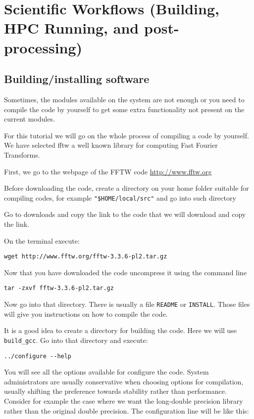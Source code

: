 \chapter{Scientific Workflows (Building, HPC Running, and post-processing)}


\section{Building/installing software}
Sometimes, the modules available on the system are not enough or you need to compile the code by yourself to get some extra functionality not present on the current modules. 

For this tutorial we will go on the whole process of compiling a code by yourself.
We have selected fftw a well known library for computing Fast Fourier Transforms. 

First, we go to the webpage of the FFTW code \url{http://www.fftw.org}

Before downloading the code, create a directory on your home folder suitable for compiling codes, for example \verb|"$HOME/local/src"| and go into such directory

Go to downloads and copy the link to the code that we will download and copy the link.

On the terminal execute:

\begin{lstlisting}
wget http://www.fftw.org/fftw-3.3.6-pl2.tar.gz
\end{lstlisting}

Now that you have downloaded the code uncompress it using the command line

\begin{lstlisting}
tar -zxvf fftw-3.3.6-pl2.tar.gz
\end{lstlisting}

Now go into that directory. There is usually a file \texttt{README} or \texttt{INSTALL}. Those files will give you instructions on how to compile the code.

It is a good idea to create a directory for building the code. Here we will use \verb|build_gcc|.
Go into that directory and execute:

\begin{lstlisting}
../configure --help
\end{lstlisting}

You will see all the options available for configure the code. System administrators are usually conservative when choosing options for compilation, usually shifting the preference towards stability rather than performance. 
Consider for example the case where we want the long-double precision library rather than the original double precision.
The configuration line will be like this:

